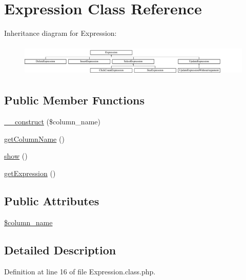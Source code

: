 \hypertarget{classExpression}{\section{Expression Class Reference}
\label{classExpression}
}
Inheritance diagram for Expression\-:\begin{figure}[H]
\begin{center}
\leavevmode
\includegraphics[height=1.555556cm]{classExpression}
\end{center}
\end{figure}
\subsection*{Public Member Functions}
\begin{DoxyCompactItemize}
\item 
\hyperlink{classExpression_a28d46b2c6acfa7c947d6a3e1513c3fe1}{\-\_\-\-\_\-construct} (\$column\-\_\-name)
\item 
\hyperlink{classExpression_a1822fc4ae1532c280ed017265aff00d7}{get\-Column\-Name} ()
\item 
\hyperlink{classExpression_abe2ca73915eb11fbfbc67d14b610bace}{show} ()
\item 
\hyperlink{classExpression_aac1c43a04af3c8208e48e4a67283ff81}{get\-Expression} ()
\end{DoxyCompactItemize}
\subsection*{Public Attributes}
\begin{DoxyCompactItemize}
\item 
\hyperlink{classExpression_aa097fe1e0f08ca2a83341acc172811dd}{\$column\-\_\-name}
\end{DoxyCompactItemize}


\subsection{Detailed Description}


Definition at line 16 of file Expression.\-class.\-php.



